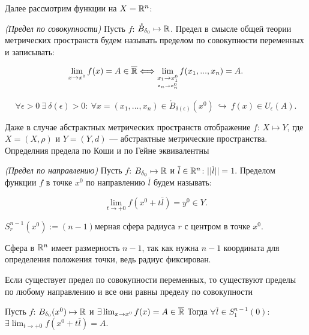 Далее рассмотрим функции на $X = \mathbb{R} ^n$:

\begin{definition}
    \textit{(Предел по совокупности)} Пусть $f$: $\mathring{B}_{\delta _0} \mapsto \mathbb{R}$. Предел в смысле общей теории метрических пространств будем называть пределом по совокупности переменных и записывать:

    $$\lim_{x \to x^0} f(x) = A \in \overline{\mathbb{R}}  \Longleftrightarrow \lim\limits_{\underset{x_n \to x_n^0}{x_1 \to x_{1}^0}} f (x_1, ..., x_n) = A. $$
    
    $$\forall \epsilon > 0 \  \exists \  \delta(\epsilon) > 0: \ \forall x = (x_{1}, ..., x_n) \in \mathring{B}_{\delta(\epsilon)}(x^0) \  \hookrightarrow \ f(x) \in U_\epsilon(A).
    $$
    
\end{definition}

\begin{note}
    Даже в случае абстрактных метрических пространств отображение $f$: $X \mapsto Y$, где $X = (X, \rho)$ и $Y = (Y, d)$ --- абстрактные метрические пространства. Определния предела по Коши и по Гейне эквивалентны
\end{note}

\begin{definition}
    \textit{(Предел по направлению)} Пусть $f$: $B_{\delta _0} \mapsto \mathbb{R}$ и $\overline{l} \in \mathbb{R}^n$: $||\overline{l}|| = 1$. Пределом функции $f$ в точке $x^0$ по направлению $\overline{l}$ будем называть:

    $$\lim_{t \to +0} f (x^0 + t\overline{l}) = y^{0} \in Y. $$
\end{definition}

\begin{definition}
$S_r^{n-1}(x^0) := (n-1)$мерная сфера радиуса $r$ с центром в точке $x^0$.

    Сфера в $\mathbb{R}^n$ имеет размерность $n-1$, так как нужна $n-1$ координата для определения положения точки, ведь радиус фиксирован.


\end{definition}

\begin{lemma}
    Если существует предел по совокупности переменных, то существуют пределы по любому направлению и все они равны пределу по совокупности

    Пусть $f$: $B_{\delta _0}(x^0) \mapsto \mathbb{R}$ и $\exists \lim_{x \to x^0} f(x) = A \in \overline{\mathbb{R}}$ Тогда $\forall \overline{l} \in S^{n-1}_1(0)$: $ \exists \lim_{t \to +0} f(x^0 + t\overline{l}) = A.$ 
    
\end{lemma}

